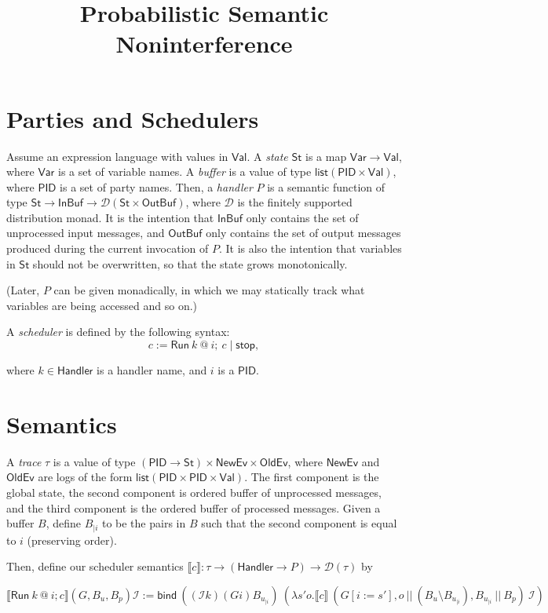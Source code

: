 \documentclass{article}
\title {Probabilistic Semantic Noninterference}
\newcommand{\Val}{\mathsf{Val}}
\newcommand{\St}{\mathsf{St}}
\newcommand{\InBuf}{\mathsf{InBuf}}
\newcommand{\OutBuf}{\mathsf{OutBuf}}
\newcommand{\PID}{\mathsf{PID}}
\newcommand{\Var}{\mathsf{Var}}
\newcommand{\Handler}{\mathsf{Handler}}
\renewcommand{\list}{\mathsf{list}}
\newcommand{\D}{\mathcal{D}}
\newcommand{\NewEv}{\mathsf{NewEv}}
\newcommand{\OldEv}{\mathsf{OldEv}}
\begin{document}
\maketitle

\section{Parties and Schedulers}

Assume an expression language with values in $\Val$. A \emph{state} $\St$ is a map $\Var \to \Val$, where $\Var$ is a set of variable names. 
A \emph{buffer} is a value of type $\list (\PID \times \Val)$, where $\PID$ is a set of party names.
Then, a \emph{handler} $P$ is a semantic function of type $\St \to \InBuf \to \D(\St \times \OutBuf)$, where $\D$ is the finitely supported distribution monad. It is the intention that $\InBuf$ only contains the set of unprocessed input messages, and $\OutBuf$ only contains the set of output messages produced during the current invocation of $P$. It is also the intention that variables in $\St$ should not be overwritten, so that the state grows monotonically.

(Later, $P$ can be given monadically, in which we may statically track what variables are being accessed and so on.)

A \emph{scheduler} is defined by the following syntax:
\[ c := \textsf{Run}\ k\ @\ i;\ c \mid \textsf{stop}, \]

where $k \in \Handler$ is a handler name, and $i$ is a $\PID$.

\section{Semantics}

A \emph{trace} $\tau$ is a value of type $(\PID \to \St) \times \NewEv \times \OldEv$, where $\NewEv$ and $\OldEv$ are logs of the form $\list (\PID \times \PID \times \Val)$. The first component is the global state, the second component is ordered buffer of unprocessed messages, and the third component is the ordered buffer of processed messages. Given a buffer $B$, define $B_{| i}$ to be the pairs in $B$ such that the second component is equal to $i$ (preserving order).

Then, define our scheduler semantics $\llbracket c \rrbracket : \tau \to (\Handler \to P) \to \D(\tau)$ by

\[\llbracket \textsf{Run}\ k\ @\ i; c \rrbracket (G, B_u, B_p) \mathcal{I} := \textsf{bind}\ ((\mathcal{I} k) (G i) B_{u_{| i}})\ (\lambda s' o. \llbracket c \rrbracket\ (G[i := s'], o\ ||\ (B_u \setminus B_{u_{| i}}), B_{u_{| i}}\ ||\ B_p)\ \mathcal{I})\]
\end{document}
